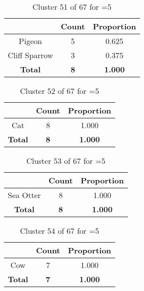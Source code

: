\begin{table}[ht!]
\centering
\begin{tabular}{|c|c|c|}
\hline
\bf \Spec{} &\bf Count &\bf Proportion\\ \hline \hline
Pigeon & 5 & 0.625\\ \hline
Cliff Sparrow & 3 & 0.375\\ \hline
\hline
\bf Total & \bf 8 & \bf 1.000\\ \hline
\end{tabular}
\label{tab:cluster:51:5}
\caption{Cluster 51 of 67 for \minneigh{}=5}
\end{table}

\begin{table}[ht!]
\centering
\begin{tabular}{|c|c|c|}
\hline
\bf \Spec{} &\bf Count &\bf Proportion\\ \hline \hline
Cat & 8 & 1.000\\ \hline
\hline
\bf Total & \bf 8 & \bf 1.000\\ \hline
\end{tabular}
\label{tab:cluster:52:5}
\caption{Cluster 52 of 67 for \minneigh{}=5}
\end{table}

\begin{table}[ht!]
\centering
\begin{tabular}{|c|c|c|}
\hline
\bf \Spec{} &\bf Count &\bf Proportion\\ \hline \hline
Sea Otter & 8 & 1.000\\ \hline
\hline
\bf Total & \bf 8 & \bf 1.000\\ \hline
\end{tabular}
\label{tab:cluster:53:5}
\caption{Cluster 53 of 67 for \minneigh{}=5}
\end{table}

\begin{table}[ht!]
\centering
\begin{tabular}{|c|c|c|}
\hline
\bf \Spec{} &\bf Count &\bf Proportion\\ \hline \hline
Cow & 7 & 1.000\\ \hline
\hline
\bf Total & \bf 7 & \bf 1.000\\ \hline
\end{tabular}
\label{tab:cluster:54:5}
\caption{Cluster 54 of 67 for \minneigh{}=5}
\end{table}

